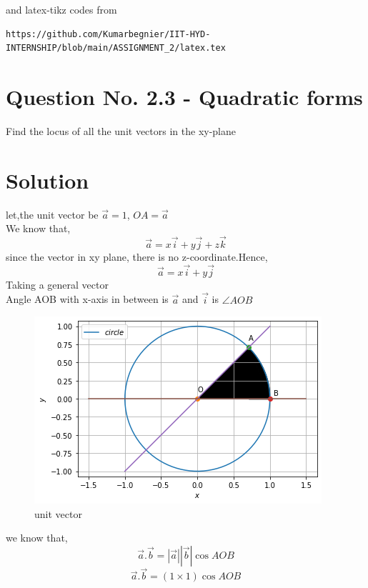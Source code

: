 \documentclass[journal,12pt,twocolumn]{IEEEtran}
\begin{document}
%
and latex-tikz codes from
%
\begin{lstlisting}
https://github.com/Kumarbegnier/IIT-HYD-INTERNSHIP/blob/main/ASSIGNMENT_2/latex.tex
\end{lstlisting}
\section{Question No. 2.3 - Quadratic forms}
Find the locus of all the unit vectors in the
xy-plane%
\section{Solution}
% 
let,the unit vector be $\vec{a}=1$, $OA= \vec{a}$ \\
%
We know that,
%
\begin{equation}
\vec{a} = x\vec{i}+y\vec{j}+z\vec{k}
\end{equation}
%
since the vector in xy plane, there is no z-coordinate.Hence,
%
\begin{equation}
\vec{a} = x\vec{i}+y\vec{j}
\end{equation}
%
Taking a general vector\\
Angle AOB with x-axis in between is  $\vec{a}$ and $\vec{i}$ is $\angle{AOB}$
%
\begin{figure}[!h]
\centering
\includegraphics[width= \columnwidth]{figure2.png}
\caption{unit vector}
\label{Figure}
\end{figure}
%
we know that,
%
\begin{equation}
\vec{a}.\vec{b} = |\vec{a}||\vec{b}|\cos{AOB}
\end{equation}
%
\begin{equation}
\vec{a}.\vec{b} = (1 \times 1) \cos{AOB}
\end{equation}
\end{document}

